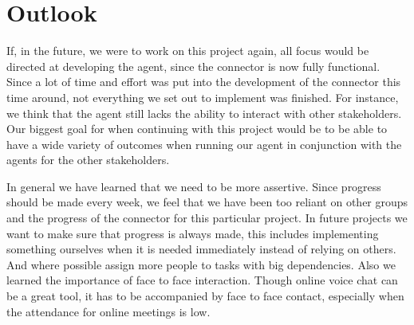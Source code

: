 \chapter{Outlook}
\label{chap:Outlook}

If, in the future, we were to work on this project again, all focus would be directed at developing the agent, since the connector is now fully functional. Since a lot of time and effort was put into the development of the connector this time around, not everything we set out to implement was finished. For instance, we think that the agent still lacks the ability to interact with other stakeholders. Our biggest goal for when continuing with this project would be to be able to have a wide variety of outcomes when running our agent in conjunction with the agents for the other stakeholders.

In general we have learned that we need to be more assertive. Since progress should be made every week, we feel that we have been too reliant on other groups and the progress of the connector for this particular project. In future projects we want to make sure that progress is always made, this includes implementing something ourselves when it is needed immediately instead of relying on others. And where possible assign more people to tasks with big dependencies. Also we learned the importance of face to face interaction. Though online voice chat can be a great tool, it has to be accompanied by face to face contact, especially when the attendance for online meetings is low.
